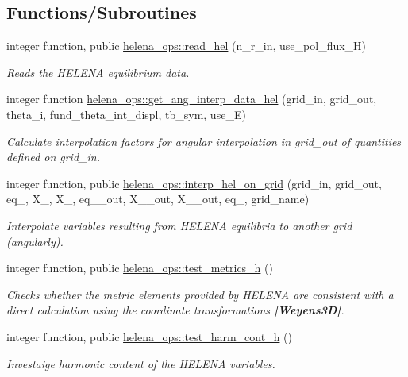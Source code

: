 \subsection*{Functions/\+Subroutines}
\begin{DoxyCompactItemize}
\item 
integer function, public \hyperlink{namespacehelena__ops_ae05ba1182eb002d93c27ca4ff7ab8cf2}{helena\+\_\+ops\+::read\+\_\+hel} (n\+\_\+r\+\_\+in, use\+\_\+pol\+\_\+flux\+\_\+H)
\begin{DoxyCompactList}\small\item\em Reads the H\+E\+L\+E\+NA equilibrium data. \end{DoxyCompactList}\item 
integer function \hyperlink{namespacehelena__ops_ab1329afe5af2ff92d96f4be15a096b38}{helena\+\_\+ops\+::get\+\_\+ang\+\_\+interp\+\_\+data\+\_\+hel} (grid\+\_\+in, grid\+\_\+out, theta\+\_\+i, fund\+\_\+theta\+\_\+int\+\_\+displ, tb\+\_\+sym, use\+\_\+E)
\begin{DoxyCompactList}\small\item\em Calculate interpolation factors for angular interpolation in {\ttfamily grid\+\_\+out} of quantities defined on {\ttfamily grid\+\_\+in}. \end{DoxyCompactList}\item 
integer function, public \hyperlink{namespacehelena__ops_a7796861de18ae7ac9c3aa07a8628be38}{helena\+\_\+ops\+::interp\+\_\+hel\+\_\+on\+\_\+grid} (grid\+\_\+in, grid\+\_\+out, eq\+\_, X\+\_, X\+\_, eq\+\_\+\_\+out, X\+\_\+\_\+out, X\+\_\+\_\+out, eq\+\_, grid\+\_\+name)
\begin{DoxyCompactList}\small\item\em Interpolate variables resulting from H\+E\+L\+E\+NA equilibria to another grid (angularly). \end{DoxyCompactList}\item 
integer function, public \hyperlink{namespacehelena__ops_a0f156b3653264fb016d6d311eb59114c}{helena\+\_\+ops\+::test\+\_\+metrics\+\_\+h} ()
\begin{DoxyCompactList}\small\item\em Checks whether the metric elements provided by H\+E\+L\+E\+NA are consistent with a direct calculation using the coordinate transformations {\bfseries [Weyens3D]}. \end{DoxyCompactList}\item 
integer function, public \hyperlink{namespacehelena__ops_a83f2ad5dc967c7bae287b60fddb8eb0a}{helena\+\_\+ops\+::test\+\_\+harm\+\_\+cont\+\_\+h} ()
\begin{DoxyCompactList}\small\item\em Investaige harmonic content of the H\+E\+L\+E\+NA variables. \end{DoxyCompactList}\end{DoxyCompactItemize}
